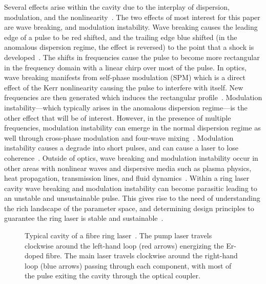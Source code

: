 \documentclass[9pt,twocolumn,twoside]{osajnl}
\begin{document}
Several effects arise within the cavity due to the interplay of dispersion, modulation, and the nonlinearity~\cite{bohun2015, coen1997, lapre2019, meng2020, oktem2010, shao2019, woodward2018}. The two effects of most interest for this paper are wave breaking, and modulation instability. Wave breaking causes the leading edge of a pulse to be red shifted, and the trailing edge blue shifted (in the anomalous dispersion regime, the effect is reversed) to the point that a shock is developed~\cite{anderson1992, rothenberg1989a, rothenberg1989b, tomlinson1984, tomlinson1985}. The shifts in frequencies cause the pulse to become more rectangular in the frequency domain with a linear chirp over most of the pulse. In optics, wave breaking manifests from self-phase modulation (SPM) which is a direct effect of the Kerr nonlinearity causing the pulse to interfere with itself. New frequencies are then generated which induces the rectangular profile~\cite{agrawal2013, woodward2018}. Modulation instability---which typically arises in the anomalous dispersion regime---is the other effect that will be of interest. However, in the presence of multiple frequencies, modulation instability can emerge in the normal dispersion regime as well through cross-phase modulation and four-wave mixing~\cite{agrawal1987, agrawal2013, haelterman1992}. Modulation instability causes a degrade into short pulses, and can cause a laser to lose coherence~\cite{agrawal1987, coen1997, haelterman1992}. Outside of optics, wave breaking and modulation instability occur in other areas with nonlinear waves and dispersive media such as plasma physics, heat propagation, transmission lines, and fluid dynamics~\cite{coen1997, rothenberg1989b}. Within a ring laser cavity wave breaking and modulation instability can become parasitic leading to an unstable and unsustainable pulse. This gives rise to the need of understanding the rich landscape of the parameter space, and determining design principles to guarantee the ring laser is stable and sustainable~\cite{bohun2015, burgoyneemail, finot2008, lapre2019, woodward2018}.

\begin{figure}[tbp]
	\centering
	
	\caption{Typical cavity of a fibre ring laser~\cite{burgoyne2014, chung2017, lapre2019, shao2019}. The pump laser travels clockwise around the left-hand loop (red arrows) energizing the Er-doped fibre. The main laser travels clockwise around the right-hand loop (blue arrows) passing through each component, with most of the pulse exiting the cavity through the optical coupler.}
	\label{fig:cavity}
\end{figure}
\end{document}
